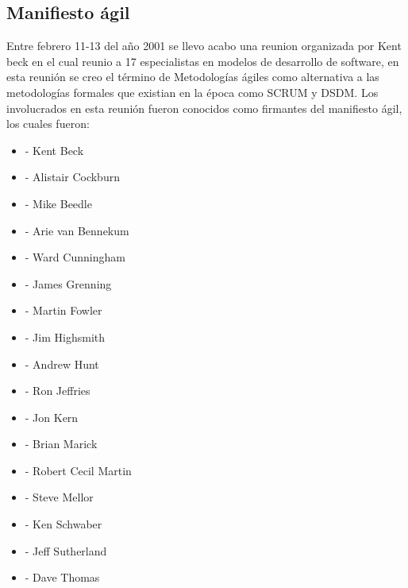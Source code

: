 \documentclass[12pt,a4paper]{article}
\begin{document}
	\subsection{Manifiesto \'agil}
	Entre febrero 11-13 del a\~no 2001 se llevo acabo una reunion organizada por Kent beck en el cual reunio a 17 especialistas en modelos de desarrollo de software, en esta reuni\'on se creo el t\'ermino de Metodolog\'ias \'agiles como alternativa a las metodolog\'ias formales que existian en la \'epoca como SCRUM y DSDM.
	Los involucrados en esta reuni\'on fueron conocidos como firmantes del manifiesto \'agil, los cuales fueron:
	\begin{itemize}	
		\item- Kent Beck
		\item- Alistair Cockburn
		\item- Mike Beedle
		\item- Arie van Bennekum
		\item- Ward Cunningham
		\item- James Grenning
		\item- Martin Fowler
		\item- Jim Highsmith
		\item- Andrew Hunt
		\item- Ron Jeffries
		\item- Jon Kern
		\item- Brian Marick
		\item- Robert Cecil Martin
		\item- Steve Mellor
		\item- Ken Schwaber
		\item- Jeff Sutherland
		\item- Dave Thomas
		\\
	\end{itemize}		
\end{document}
